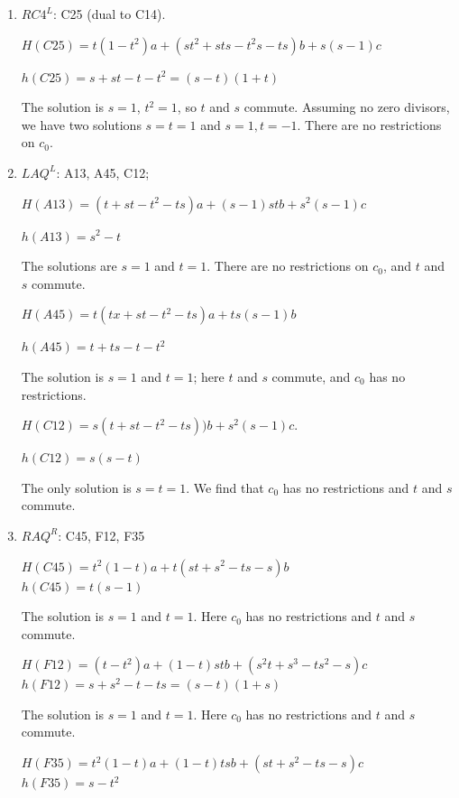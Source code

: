 \documentclass[11pt]{amsart}
\theoremstyle{definition}
\begin{document}
\begin{enumerate}
    
    
    
    \item[(20)] $RC4^L$:  C25 (dual to C14). 

    $H(C25) = t(1-t^2)a +(st^2+sts-t^2s-ts)b +s(s-1)c$

    $h(C25) = s+st -t-t^2= (s-t)(1+t)$

    The solution is  $s=1$, $t^2=1$, so $t$ and $s$ commute. Assuming no zero divisors, we have two solutions $s=t=1$ and $s=1, t=-1$. There are no restrictions on $c_0$. 
    
    
    \item[(21)] $LAQ^L$: A13, A45, C12; 
    
    $H(A13) = (t+st-t^2-ts)a+(s-1)stb+s^2(s-1)c$

    $h(A13) = s^2-t$

   The solutions are $s=1$ and $t=1$. There are no restrictions on $c_0$, and  
     $t$ and $s$  commute.

    
    $H(A45) = t(tx +st -t^2 -ts)a +ts(s-1)b$ 

    $h(A45) = t+ts-t-t^2$

    The solution is $s=1$ and $t=1$; here $t$ and $s$  commute, and $c_0$ has no restrictions. 

    
    

    $H(C12) = s(t+st-t^2 -ts))b +s^2(s-1)c$. 
    
    $h(C12) = s(s-t)$

    The only solution is $s=t=1$. We find that $c_0$ has no restrictions and $t$ and $s$ commute.
    
    

    
    \item[(22)] $RAQ^R$: C45, F12, F35 

    $H(C45) = t^2(1-t)a+t(st+s^2-ts-s)b$ \\
    $h(C45) = t(s-1)$
    

     The solution is $s=1$ and $t=1$. Here $c_0$ has no restrictions and  $t$ and $s$  commute.

   

    $H(F12) = (t-t^2)a +(1-t)stb + (s^2t+s^3-ts^2-s)c$ \\
    $h(F12) = s +s^2 -t -ts =(s-t)(1+s)$

    The solution is $s=1$ and $t=1$. Here $c_0$ has no restrictions and  $t$ and $s$ commute.

   

    $H(F35) = t^2(1-t)a +(1-t)tsb + (st+s^2 -ts -s) c $\\
    $h(F35) = s -t^2$


\end{enumerate}
\end{document}
